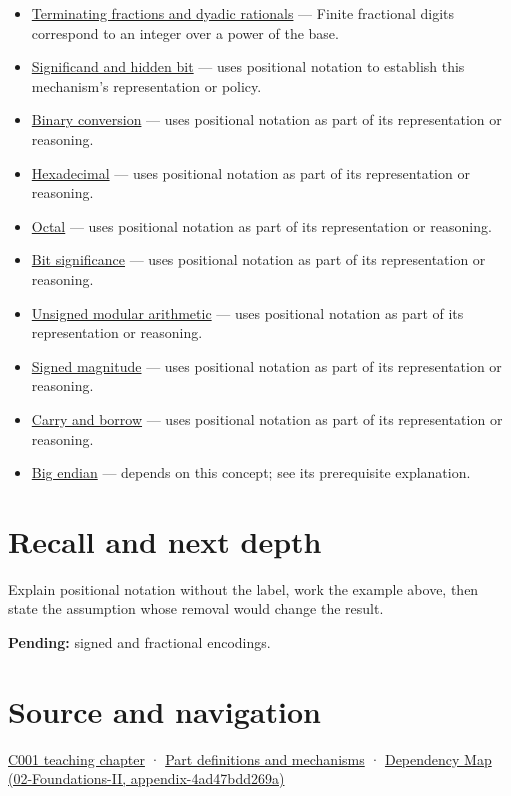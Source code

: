 \begin{itemize}
\item
  \hyperref[appendix-2a2f1b74bdd3]{Terminating fractions and dyadic rationals} --- Finite fractional digits correspond to an integer over a power of the base.
\item
  \hyperref[appendix-a24fd710cf67]{Significand and hidden bit} --- uses positional notation to establish this mechanism's representation or policy.
\item
  \hyperref[appendix-dc552784a2c0]{Binary conversion} --- uses positional notation as part of its representation or reasoning.
\item
  \hyperref[appendix-6b8075763724]{Hexadecimal} --- uses positional notation as part of its representation or reasoning.
\item
  \hyperref[appendix-17fc1bc8b305]{Octal} --- uses positional notation as part of its representation or reasoning.
\item
  \hyperref[appendix-280445746493]{Bit significance} --- uses positional notation as part of its representation or reasoning.
\item
  \hyperref[appendix-c99977d88b33]{Unsigned modular arithmetic} --- uses positional notation as part of its representation or reasoning.
\item
  \hyperref[appendix-ce20506c8532]{Signed magnitude} --- uses positional notation as part of its representation or reasoning.
\item
  \hyperref[appendix-d52d5f78ffd1]{Carry and borrow} --- uses positional notation as part of its representation or reasoning.
\item
  \hyperref[appendix-92e040df969a]{Big endian} --- depends on this concept; see its prerequisite explanation.
\end{itemize}

\section{Recall and next depth}\label{appendix-83c3f28f7bda-recall-and-next-depth}

Explain positional notation without the label, work the example above, then state the assumption whose removal would change the result.

\textbf{Pending:} signed and fractional encodings.

\section{Source and navigation}\label{appendix-83c3f28f7bda-source-and-navigation}

\href{Continuous\%20Notes/Computing\%20Foundations\%20-\%20From\%20Bits\%20to\%20C++\%20and\%20Systems\%20APIs\#From\%20a\%20signal\%20to\%20an\%20interpretation}{C001 teaching chapter} · \hyperref[appendix-fd090d982a15]{Part definitions and mechanisms} · \href{../02-Foundations-II/main.pdf\#nameddest=appendix-4ad47bdd269a}{Dependency Map (02-Foundations-II, appendix-4ad47bdd269a)}
